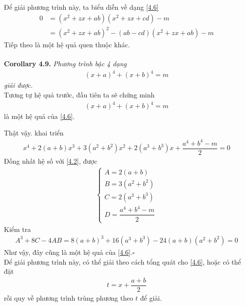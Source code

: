 \documentclass[a4paper,oneside]{book}
\numberwithin{equation}{chapter}
\begin{document}
Để giải phương trình này, ta biểu diễn về dạng \eqref{4.6}
\begin{align}
0 &= \left( {{x^2} + zx + ab} \right)\left( {{x^2} + zx + cd} \right) - m \\
&=  {\left( {{x^2} + zx + ab} \right)^2} - \left( {ab - cd} \right)\left( {{x^2} + zx + ab} \right) - m
\end{align}
Tiếp theo là một hệ quả quen thuộc khác.\\
\\
\textbf{Corollary 4.9. } \textit{Phương trình bậc 4 dạng 
\begin{align}
{\left( {x + a} \right)^4} + {\left( {x + b} \right)^4} = m
\end{align}
giải được.}\\

Tương tự hệ quả trước, đầu tiên ta sẽ chứng minh 
\begin{align}
{\left( {x + a} \right)^4} + {\left( {x + b} \right)^4} = m 
\end{align}
là một hệ quả của \eqref{4.6}.

Thật vậy. khai triển 
\begin{align}
{x^4} + 2\left( {a + b} \right){x^3} + 3\left( {{a^2} + {b^2}} \right){x^2} + 2\left( {{a^3} + {b^3}} \right)x + \dfrac{{{a^4} + {b^4} - m}}{2} = 0
\end{align}
Đồng nhất hệ số với \eqref{4.2}, được
\begin{align}
\left\{ \begin{array}{l}
A = 2\left( {a + b} \right)\\
B = 3\left( {{a^2} + {b^2}} \right)\\
C = 2\left( {{a^3} + {b^3}} \right)\\
D = \dfrac{{{a^4} + {b^4} - m}}{2}
\end{array} \right.
\end{align}
Kiểm tra
\begin{align}
{A^3} + 8C - 4AB = 8{\left( {a + b} \right)^3} + 16\left( {{a^3} + {b^3}} \right) - 24\left( {a + b} \right)\left( {{a^2} + {b^2}} \right) = 0
\end{align}
Như vậy, đây cũng là một hệ quả của \eqref{4.6}.\hfill $\square$\\

Để giải phương trình này, có thể giải theo cách tổng quát cho \eqref{4.6}, hoặc có thể đặt 
\begin{align}
t = x + \dfrac{{a + b}}{2}
\end{align}
rồi quy về phương trình trùng phương theo $t$ để giải.
\end{document}
